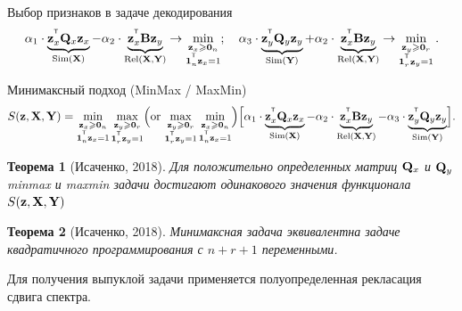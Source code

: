 \documentclass[10pt]{beamer}
\newtheorem{rustheorem}{Теорема}
\begin{document}
\begin{frame}{Выбор признаков в задаче декодирования}
	\[
		\alpha_1 \cdot \underbrace{\bz_x^{\T} \bQ_x \bz_x}_{\text{Sim}(\bX)} - \alpha_2 \cdot \underbrace{\vphantom{()} \bz_x^{\T}\mathbf{B} \bz_y}_{\text{Rel}(\bX, \bY)} \rightarrow \min_{\substack{\bz_x \geq \bZero_n \\ \bOne_n^{\T}\bz_x=1}}; \quad
		\alpha_3 \cdot \underbrace{\bz_y^{\T} \bQ_y \bz_y}_{\text{Sim}(\bY)} + \alpha_2 \cdot \underbrace{\vphantom{()} \bz_x^{\T} \mathbf{B} \bz_y}_{\text{Rel}(\bX, \bY)} \rightarrow \min_{\substack{\bz_y \geq \bZero_r  \\ \bOne_r^{\T}\bz_y=1}}.
	\]
	\vspace{-0.3cm}
	\begin{block}{Минимаксный подход (MinMax / MaxMin)}
		\vspace{-0.6cm}
		\[
		S(\bz, \bX, \bY) = \min_{\substack{\bz_x \geq \bZero_n \\ \bOne_n^{\T}\bz_x=1}} 	\max_{\substack{\bz_y \geq \bZero_r \\ \bOne_r^{\T}\bz_y=1}} \Bigl(\text {or} \, \max_{\substack{\bz_y \geq \bZero_r \\ \bOne_r^{\T}\bz_y=1}} \min_{\substack{\bz_x \geq \bZero_n \\ \bOne_n^{\T}\bz_x=1}}\Bigr) \Bigl[\alpha_1 \cdot \underbrace{\bz_x^{\T} \bQ_x \bz_x}_{\text{Sim}(\bX)} - \alpha_2 \cdot \underbrace{\bz_x^{\T} \bB \bz_y}_{\text{Rel}(\bX, \bY)} - \alpha_3 \cdot \underbrace{\bz_y^{\T} \bQ_y \bz_y}_{\text{Sim}(\bY)}\Bigr].
		\]
	\end{block}
	\vspace{-0.4cm}
	\begin{rustheorem}[Исаченко, 2018]
		Для положительно определенных матриц $\bQ_x$ и $\bQ_y$ minmax и maxmin задачи достигают одинакового значения функционала $S(\bz, \bX, \bY)$
	\end{rustheorem}
	\vspace{-0.2cm}
	\begin{rustheorem}[Исаченко, 2018]
		Минимаксная задача эквивалентна задаче квадратичного программирования с $n + r + 1$ переменными.
	\end{rustheorem}
	Для получения выпуклой задачи применяется полуопределенная рекласация сдвига спектра.

\end{frame}
\end{document}

